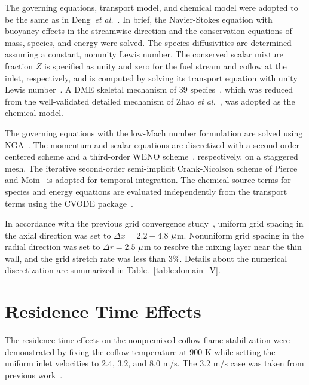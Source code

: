 \documentclass{wssci}
\begin{document}
The governing equations, transport model, and chemical model were adopted to be the same as in Deng~\emph{et al.}~\cite{deng15}.  In brief, the Navier-Stokes equation with buoyancy effects in the streamwise direction and the conservation equations of mass, species, and energy were solved.  The species diffusivities are determined assuming a constant, nonunity Lewis number.  The conserved scalar mixture fraction $Z$ is specified as unity and zero for the fuel stream and coflow at the inlet, respectively, and is computed by solving its transport equation with unity Lewis number~\cite{pitsch98b}.  A DME skeletal mechanism of $39$ species~\cite{bhagatwala15}, which was reduced from the well-validated detailed mechanism of Zhao \emph{et al.}~\cite{zhao08}, was adopted as the chemical model.

The governing equations with the low-Mach number formulation are solved using NGA~\cite{desjardins08}.  The momentum and scalar equations are discretized with a second-order centered scheme and a third-order WENO scheme~\cite{liu94}, respectively, on a staggered mesh.  The iterative second-order semi-implicit Crank-Nicolson scheme of Pierce and Moin~\cite{pierce01} is adopted for temporal integration.  The chemical source terms for species and energy equations are evaluated independently from the transport terms using the CVODE package~\cite{cohen96}.

In accordance with the previous grid convergence study~\cite{deng15}, uniform grid spacing in the axial direction was set to $\Delta x = 2.2-4.8$ ${\rm \mu}$m.  Nonuniform grid spacing in the radial direction was set to $\Delta r = 2.5$ ${\rm \mu}$m to resolve the mixing layer near the thin wall, and the grid stretch rate was less than $3$\%.  Details about the numerical discretization are summarized in Table.~\ref{table:domain_V}.   
\section{Residence Time Effects}

The residence time effects on the nonpremixed coflow flame stabilization were demonstrated by fixing the coflow temperature at $900$ K while setting the uniform inlet velocities to $2.4$, $3.2$, and $8.0$ m/s.  The $3.2$ m/s case was taken from previous work~\cite{deng15}.  

\begin{table}
  \caption{Computational domain and number of grid points.}
  \label{table:domain_V}
  \centering
  \normalsize
\end{table}
\end{document}
